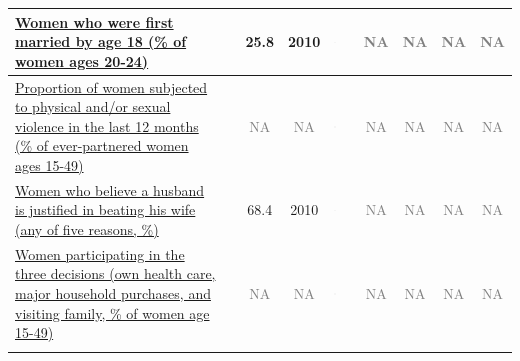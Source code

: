 \documentclass[
]{article}
\begin{document}
\begin{ThreePartTable}
\begin{longtable}[t]{>{\raggedright\arraybackslash}p{9cm}>{\raggedright\arraybackslash}p{1.1cm}>{}c>{}c>{}c>{}c>{}c>{}c>{}c>{}c}
\cmidrule{1-10}\pagebreak[0]
\href{https://genderdata.worldbank.org/indicators/sp-2024-fe-zs/}{Women who were first married by age 18 (\% of women ages 20-24)} &  & \textcolor[HTML]{000004}{25.8} & \textcolor[HTML]{000004}{2010} & \includegraphics[width=0.1in, height=0.1in]{naicon.png} & \cellcolor{gray}{\textcolor{white}{\textbf{NA}}} & \textcolor{gray}{NA} & \textcolor{gray}{NA} & \textcolor{gray}{NA} & \textcolor{gray}{NA}\\
\cmidrule{1-10}\pagebreak[0]
\href{https://genderdata.worldbank.org/indicators/sg-vaw-1549-zs/}{Proportion of women subjected to physical and/or sexual violence in the last 12 months (\% of ever-partnered women ages 15-49)} &  & \textcolor{gray}{NA} & \textcolor{gray}{NA} & \includegraphics[width=0.1in, height=0.1in]{naicon.png} & \cellcolor{gray}{\textcolor{white}{\textbf{NA}}} & \textcolor{gray}{NA} & \textcolor{gray}{NA} & \textcolor{gray}{NA} & \textcolor{gray}{NA}\\
\cmidrule{1-10}\pagebreak[0]
\href{https://genderdata.worldbank.org/indicators/sg-vaw-zs}{Women who believe a husband is justified in beating his wife (any of five reasons, \%)} &  & \textcolor[HTML]{000004}{68.4} & \textcolor[HTML]{000004}{2010} & \includegraphics[width=0.1in, height=0.1in]{naicon.png} & \cellcolor{gray}{\textcolor{white}{\textbf{NA}}} & \textcolor{gray}{NA} & \textcolor{gray}{NA} & \textcolor{gray}{NA} & \textcolor{gray}{NA}\\
\cmidrule{1-10}\pagebreak[0]
\href{https://genderdata.worldbank.org/indicators/sg-dmk/}{Women participating in the three decisions (own health care, major household purchases, and visiting family, \% of women age 15-49)} &  & \textcolor{gray}{NA} & \textcolor{gray}{NA} & \includegraphics[width=0.1in, height=0.1in]{naicon.png} & \cellcolor{gray}{\textcolor{white}{\textbf{NA}}} & \textcolor{gray}{NA} & \textcolor{gray}{NA} & \textcolor{gray}{NA} & \textcolor{gray}{NA}\\*
\end{longtable}
\end{ThreePartTable}
\endgroup{}
\end{document}
